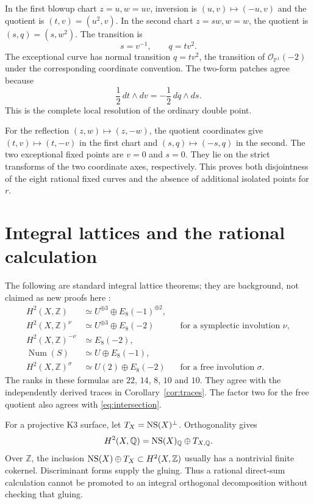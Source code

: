 \documentclass[11pt]{amsart}
\theoremstyle{definition}
\newcommand{\Q}{\mathbb Q}\newcommand{\C}{\mathbb C}\newcommand{\Z}{\mathbb Z}
\newcommand{\Num}{\operatorname{Num}}\newcommand{\Aut}{\operatorname{Aut}}
\begin{document}
In the first blowup chart $z=u,w=uv$, inversion is
$(u,v)\mapsto(-u,v)$ and the quotient is $(t,v)=(u^2,v)$.
In the second chart $z=sw,w=w$, the quotient is
$(s,q)=(s,w^2)$. The transition is
\[
 s=v^{-1},\qquad q=t v^2.
\]
The exceptional curve has normal transition $q=t v^2$, the transition
of $\mathcal O_{\mathbb P^1}(-2)$ under the corresponding coordinate
convention. The two-form patches agree because
\[
 \frac12\,dt\wedge dv=-\frac12\,dq\wedge ds.
\]
This is the complete local resolution of the ordinary double point.

For the reflection $(z,w)\mapsto(z,-w)$, the quotient coordinates
give $(t,v)\mapsto(t,-v)$ in the first chart and
$(s,q)\mapsto(-s,q)$ in the second. The two exceptional fixed points
are $v=0$ and $s=0$. They lie on the strict transforms of the two
coordinate axes, respectively. This proves both disjointness of the
eight rational fixed curves and the absence of additional isolated
points for $r$.

\section{Integral lattices and the rational calculation}\label{app:lattice}
The following are standard integral lattice theorems; they are
background, not claimed as new proofs here \cite{Huybrechts,vGS,Ohashi}:
\begin{align*}
 H^2(X,\Z)&\simeq U^{\oplus3}\oplus E_8(-1)^{\oplus2},\\
 H^2(X,\Z)^\nu&\simeq U^{\oplus3}\oplus E_8(-2)
       &&\text{for a symplectic involution }\nu,\\
 H^2(X,\Z)^{-\nu}&\simeq E_8(-2),\\
 \Num(S)&\simeq U\oplus E_8(-1),\\
 H^2(X,\Z)^\sigma&\simeq U(2)\oplus E_8(-2)
       &&\text{for a free involution }\sigma.
\end{align*}
The ranks in these formulas are $22$, $14$, $8$, $10$ and $10$.
They agree with the independently derived traces in
Corollary~\ref{cor:traces}. The factor two for the free quotient also
agrees with \eqref{eq:intersection}.

For a projective K3 surface, let $T_X=\operatorname{NS}(X)^\perp$. Orthogonality
gives
\[
 H^2(X,\Q)=\NS(X)_\Q\oplus T_{X,\Q}.
\]
Over $\Z$, the inclusion $\NS(X)\oplus T_X\subset H^2(X,\Z)$ usually
has a nontrivial finite cokernel. Discriminant forms supply the gluing.
Thus a rational direct-sum calculation cannot be promoted to an
integral orthogonal decomposition without checking that gluing.
\end{document}
